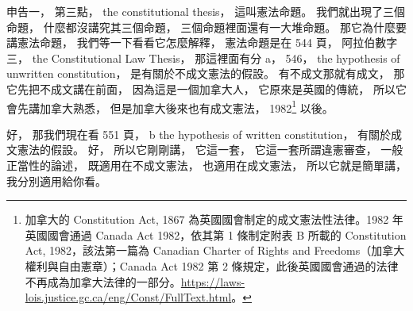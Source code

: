 \hypertarget{w02:cue:330}{}申告一，
\hypertarget{w02:cue:331}{}第三點，
\hypertarget{w02:cue:332}{}the constitutional thesis，
\hypertarget{w02:cue:333}{}這叫憲法命題。
\hypertarget{w02:cue:334}{}我們就出現了三個命題，
\hypertarget{w02:cue:335}{}什麼都沒講究其三個命題，
\hypertarget{w02:cue:336}{}三個命題裡面還有一大堆命題。
\hypertarget{w02:cue:337}{}那它為什麼要講憲法命題，
\hypertarget{w02:cue:338}{}我們等一下看看它怎麼解釋，
\hypertarget{w02:cue:339}{}憲法命題是在 544 頁，
\hypertarget{w02:cue:340}{}阿拉伯數字三，
\hypertarget{w02:cue:341}{}the Constitutional Law Thesis，
\hypertarget{w02:cue:342}{}那這裡面有分 a，
\hypertarget{w02:cue:343}{}546，
\hypertarget{w02:cue:344}{}the hypothesis of unwritten constitution，
\hypertarget{w02:cue:345}{}是有關於不成文憲法的假設。
\hypertarget{w02:cue:346}{}有不成文那就有成文，
\hypertarget{w02:cue:347}{}那它先把不成文講在前面，
\hypertarget{w02:cue:348}{}因為這是一個加拿大人，
\hypertarget{w02:cue:349}{}它原來是英國的傳統，
\hypertarget{w02:cue:350}{}所以它會先講加拿大熟悉，
\hypertarget{w02:cue:351}{}但是加拿大後來也有成文憲法，
\hypertarget{w02:cue:352}{}1982\footnote{加拿大的 Constitution Act, 1867 為英國國會制定的成文憲法性法律。1982 年英國國會通過 Canada Act 1982，依其第 1 條制定附表 B 所載的 Constitution Act, 1982，該法第一篇為 Canadian Charter of Rights and Freedoms（加拿大權利與自由憲章）；Canada Act 1982 第 2 條規定，此後英國國會通過的法律不再成為加拿大法律的一部分。\url{https://laws-lois.justice.gc.ca/eng/Const/FullText.html}。} 以後。

\hypertarget{w02:cue:353}{}好，
\hypertarget{w02:cue:354}{}那我們現在看 551 頁，
\hypertarget{w02:cue:355}{}b
\hypertarget{w02:cue:356}{}the hypothesis of written constitution，
\hypertarget{w02:cue:357}{}有關於成文憲法的假設。
\hypertarget{w02:cue:358}{}好，
\hypertarget{w02:cue:359}{}所以它剛剛講，
\hypertarget{w02:cue:360}{}它這一套，
\hypertarget{w02:cue:361}{}它這一套所謂違憲審查，
\hypertarget{w02:cue:362}{}一般正當性的論述，
\hypertarget{w02:cue:363}{}既適用在不成文憲法，
\hypertarget{w02:cue:364}{}也適用在成文憲法，
\hypertarget{w02:cue:365}{}所以它就是簡單講，
\hypertarget{w02:cue:366}{}我分別適用給你看。

